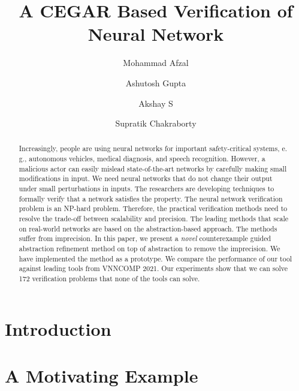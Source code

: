 \documentclass[10pt]{llncs}
\title{A CEGAR Based Verification of Neural Network}
\author{Mohammad Afzal\inst{1,2}\and Ashutosh Gupta\inst{1}\and Akshay S\inst{1}\and Supratik Chakraborty\inst{1}}
\institute{Indian Institute of Technology, Bombay, India\and TCS Research, Pune, India}
\begin{document}
\maketitle

\begin{abstract}
  Increasingly, people are using neural networks for important
  safety-critical systems, e. g., autonomous vehicles,
  medical diagnosis, and speech recognition.
  However, a malicious actor can easily
  mislead state-of-the-art networks
  by carefully making small modifications in input.
  We need neural networks that do not change their output
  under small perturbations in inputs.
  The researchers are developing techniques to formally
  verify that a network satisfies the property.
  The neural network verification problem is an NP-hard problem.
  Therefore, the practical verification methods need to resolve the
  trade-off between scalability and precision.
  The leading methods that scale on real-world
  networks are based on the abstraction-based approach.
  The methods suffer from imprecision.
  In this paper, %
  we present a {\em novel} counterexample guided abstraction
  refinement method on top of abstraction \deeppoly{} to remove
  the imprecision.  
  We have implemented the method as a prototype.
  We compare the performance of our tool against leading tools from VNNCOMP 2021.
  Our experiments show that we can solve 172
  verification problems that none of the tools
  can solve.
\end{abstract}

\section{Introduction}
\label{sec:intro}



\section{A Motivating Example}
\label{sec:motivation}

\clearpage
\end{document}
